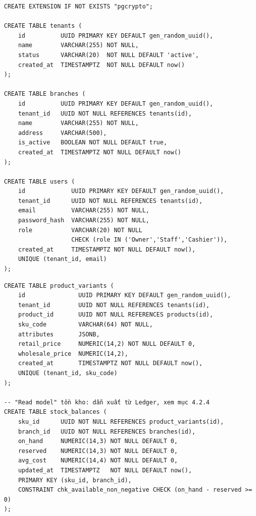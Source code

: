 \begin{lstlisting}
CREATE EXTENSION IF NOT EXISTS "pgcrypto";

CREATE TABLE tenants (
    id          UUID PRIMARY KEY DEFAULT gen_random_uuid(),
    name        VARCHAR(255) NOT NULL,
    status      VARCHAR(20)  NOT NULL DEFAULT 'active',
    created_at  TIMESTAMPTZ  NOT NULL DEFAULT now()
);

CREATE TABLE branches (
    id          UUID PRIMARY KEY DEFAULT gen_random_uuid(),
    tenant_id   UUID NOT NULL REFERENCES tenants(id),
    name        VARCHAR(255) NOT NULL,
    address     VARCHAR(500),
    is_active   BOOLEAN NOT NULL DEFAULT true,
    created_at  TIMESTAMPTZ NOT NULL DEFAULT now()
);

CREATE TABLE users (
    id             UUID PRIMARY KEY DEFAULT gen_random_uuid(),
    tenant_id      UUID NOT NULL REFERENCES tenants(id),
    email          VARCHAR(255) NOT NULL,
    password_hash  VARCHAR(255) NOT NULL,
    role           VARCHAR(20) NOT NULL
                   CHECK (role IN ('Owner','Staff','Cashier')),
    created_at     TIMESTAMPTZ NOT NULL DEFAULT now(),
    UNIQUE (tenant_id, email)
);
\end{lstlisting}

\begin{lstlisting}
CREATE TABLE product_variants (
    id               UUID PRIMARY KEY DEFAULT gen_random_uuid(),
    tenant_id        UUID NOT NULL REFERENCES tenants(id),
    product_id       UUID NOT NULL REFERENCES products(id),
    sku_code         VARCHAR(64) NOT NULL,
    attributes       JSONB,
    retail_price     NUMERIC(14,2) NOT NULL DEFAULT 0,
    wholesale_price  NUMERIC(14,2),
    created_at       TIMESTAMPTZ NOT NULL DEFAULT now(),
    UNIQUE (tenant_id, sku_code)
);

-- "Read model" tồn kho: dẫn xuất từ Ledger, xem mục 4.2.4
CREATE TABLE stock_balances (
    sku_id      UUID NOT NULL REFERENCES product_variants(id),
    branch_id   UUID NOT NULL REFERENCES branches(id),
    on_hand     NUMERIC(14,3) NOT NULL DEFAULT 0,
    reserved    NUMERIC(14,3) NOT NULL DEFAULT 0,
    avg_cost    NUMERIC(14,4) NOT NULL DEFAULT 0,
    updated_at  TIMESTAMPTZ   NOT NULL DEFAULT now(),
    PRIMARY KEY (sku_id, branch_id),
    CONSTRAINT chk_available_non_negative CHECK (on_hand - reserved >= 0)
);
\end{lstlisting}

